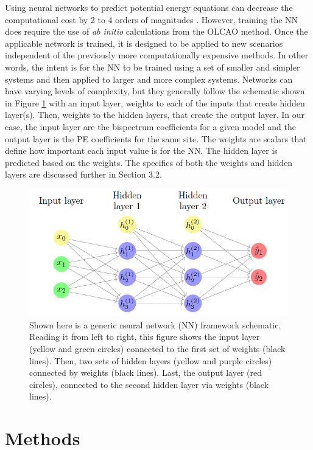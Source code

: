 \documentclass{article}
\begin{document}
Using neural networks to predict potential energy equations can decrease the computational 
cost by 2 to 4 orders of magnitudes \cite{Yanxon2020}. However, training the NN does require the 
use of \textit{ab initio} calculations from the OLCAO method. Once the applicable network is trained, 
it is designed to be applied to new scenarios independent of the previously more  
computationally expensive methods. In other words, the intent is for the NN to be trained using a 
set of smaller and simpler systems and then applied to larger and more complex systems. Networks 
can have varying levels of complexity, but they generally follow the schematic shown in Figure 
\ref{NN_sch} with an input layer, weights to 
each of the inputs that create hidden layer(s). Then, weights to the hidden layers, that create
the output layer. In our case, the input layer are the bispectrum coefficients for a given model
and the output layer is the PE coefficients for the same site. The weights are scalars that define 
how important each input value is for the NN. The hidden layer is predicted based on the weights. 
The specifics of both the weights and hidden layers are discussed further in Section 3.2.

\begin{figure}[H]
    \centering
    \includegraphics[scale=1.6]{Images/NN_size.png}
    \caption{Shown here is a generic neural network (NN) framework schematic. Reading it from left to right, this figure shows the input layer (yellow and green circles) connected to the first set of weights (black lines). Then, two sets of hidden layers (yellow and purple circles) connected by weights (black lines). Last, the output layer (red circles), connected to the second hidden layer via weights (black lines). \citep{NN}}
    \label{NN_sch}
\end{figure}

\section{Methods}
\end{document}
